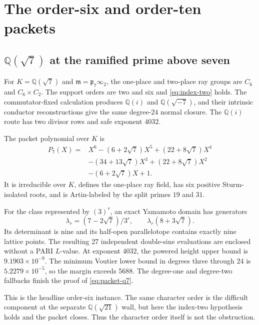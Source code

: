 \documentclass[11pt]{article}
\newcommand{\Q}{\mathbb Q}
\begin{document}
\section{The order-six and order-ten packets}\label{sec:packets}

\subsection{\texorpdfstring{\(\Q(\sqrt7)\)}{Q(sqrt(7))} at the
ramified prime above seven}

For \(K=\Q(\sqrt7)\) and
\(\mathfrak m=\mathfrak p_7\infty_2\), the one-place and two-place ray
groups are \(C_6\) and \(C_6\times C_2\).  The support orders are two
and six and \eqref{eq:index-two} holds.  The commutator-fixed calculation produces
\(\Q(i)\) and \(\Q(\sqrt{-7})\), and their intrinsic conductor
reconstructions give the same degree-$24$ normal closure.  The
\(\Q(i)\) route has two divisor rows and safe exponent \(4032\).

The packet polynomial over \(K\) is
\begin{equation}\label{eq:packet-q7}
\begin{aligned}
P_7(X)={}&X^6-(6+2\sqrt7)X^5+(22+8\sqrt7)X^4\\
 &-(34+13\sqrt7)X^3+(22+8\sqrt7)X^2\\
 &-(6+2\sqrt7)X+1.
\end{aligned}
\end{equation}
It is irreducible over \(K\), defines the one-place ray field, has six
positive Sturm-isolated roots, and is Artin-labeled by the split
primes \(19\) and \(31\).

For the class represented by \((3)^r\), an exact Yamamoto domain has
generators
\[
 \lambda_r=(7-2\sqrt7)/3^r,\qquad
 \lambda_r(8+3\sqrt7).
\]
Its determinant is nine and its half-open parallelotope contains
exactly nine lattice points.  The resulting 27 independent
double-sine evaluations are enclosed without a PARI \(L\)-value.
At exponent \(4032\), the powered height upper bound is
\(9.1903\times10^{-9}\).  The minimum Voutier lower bound in degrees
three through 24 is \(5.2279\times10^{-5}\), so the margin exceeds
5688.  The degree-one and degree-two fallbacks finish the proof of
\eqref{eq:packet-q7}.

This is the headline order-six instance.  The same character order is
the difficult component at the separate \(\Q(\sqrt{21})\) wall, but
here the index-two hypothesis holds and the packet closes.  Thus the
character order itself is not the obstruction.
\end{document}
